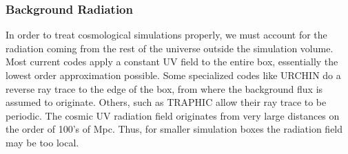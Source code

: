 \documentclass[fleq,usenatbib]{mnras}
\begin{document}
{\subsubsection{Background Radiation}
In order to treat cosmological simulations properly, we must account for the 
radiation 
coming from the rest of the universe outside the simulation volume. Most 
current codes apply a constant UV field to the entire box, essentially the 
lowest order approximation possible. Some specialized codes like URCHIN 
\citep{altayTheuns13} do a reverse ray trace to the edge of the box, from 
where the background flux is assumed to originate. Others, such as TRAPHIC 
\citep{pawlikSchaye08} allow their ray trace to be periodic.
The cosmic UV radiation field originates from very large distances on the 
order of 100's of Mpc. Thus, for smaller simulation boxes the radiation field 
may be too local.

}
\end{document}
